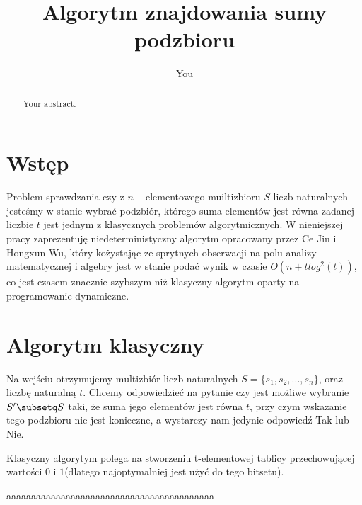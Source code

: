 \documentclass{article}
\title{Algorytm znajdowania sumy podzbioru}
\author{You}
\begin{document}
\maketitle

\begin{abstract}
Your abstract.
\end{abstract}

\section{Wstęp}
Problem sprawdzania czy z $n-$elementowego muiltizbioru $S$ liczb naturalnych jesteśmy w stanie wybrać podzbiór, którego suma elementów jest równa zadanej liczbie $t$ jest jednym z klasycznych problemów algorytmicznych. W nieniejszej pracy zaprezentuję niedeterministyczny algorytm opracowany przez Ce Jin i Hongxun Wu, który kożystając ze sprytnych obserwacji na polu analizy matematycznej i algebry jest w stanie podać wynik w czasie $O(n+tlog^2(t))$, co jest czasem znacznie szybszym niż klasyczny algorytm oparty na programowanie dynamiczne. 

\section{Algorytm klasyczny}

Na wejściu otrzymujemy multizbiór liczb naturalnych $S=\{s_1,s_2,...,s_n\}$, oraz liczbę naturalną $t$. Chcemy odpowiedzieć na pytanie czy jest możliwe wybranie $S' \subsetq S$ taki, że suma jego elementów jest równa $t$, przy czym wskazanie tego podzbioru nie jest konieczne, a wystarczy nam jedynie odpowiedź Tak lub Nie. 

Klasyczny algorytym polega na stworzeniu t-elementowej tablicy przechowującej wartości $0$ i $1$(dlatego najoptymalniej jest użyć do tego bitsetu). 

aaaaaaaaaaaaaaaaaaaaaaaaaaaaaaaaaaaaaaaaaa
\end{document}
